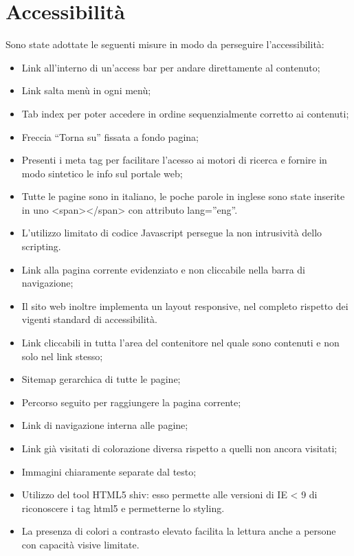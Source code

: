 \section{Accessibilità}

Sono state adottate le seguenti misure in modo da perseguire l'accessibilità:
\begin{itemize}
	\item Link all’interno di un'access bar per andare direttamente al contenuto;
	\item Link salta menù in ogni menù;
	\item Tab index per poter accedere in ordine sequenzialmente corretto ai contenuti;
	\item Freccia “Torna su” fissata a fondo pagina;
	\item Presenti i meta tag per facilitare l’acesso ai motori di ricerca e fornire in modo sintetico le info sul portale web;
	\item Tutte le pagine sono in italiano, le poche parole in inglese sono state inserite in uno <span></span> con attributo lang=”eng”.
	\item L'utilizzo limitato di codice Javascript persegue la non intrusività dello scripting.
	\item Link alla pagina corrente evidenziato e non cliccabile nella barra di navigazione;
	\item Il sito web inoltre implementa un layout responsive, nel completo rispetto dei vigenti standard di accessibilità.
	\item Link cliccabili in tutta l’area del contenitore nel quale sono contenuti e non solo nel link stesso;
	\item Sitemap gerarchica di tutte le pagine;
	\item Percorso seguito per raggiungere la pagina corrente;
	\item Link di navigazione interna alle pagine;
	\item Link già visitati di colorazione diversa rispetto a quelli non ancora visitati;
	\item Immagini chiaramente separate dal testo;
	\item Utilizzo del tool HTML5 shiv: esso permette alle versioni di IE < 9 di riconoscere i tag html5 e permetterne lo styling.
	\item La presenza di colori a contrasto elevato facilita la lettura anche a 	persone con capacità visive limitate.
	
\end{itemize}

